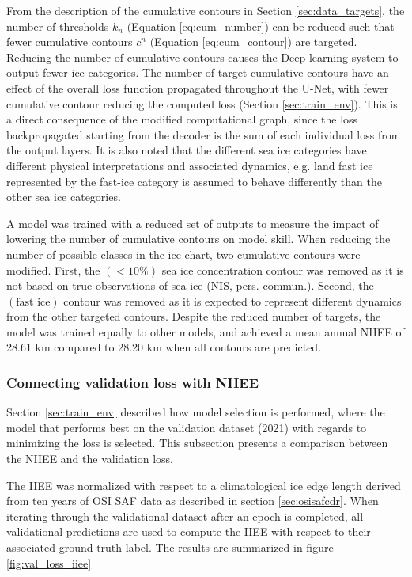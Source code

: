 \documentclass[../main/thesis]{subfiles}
\begin{document}
From the description of the cumulative contours in Section \ref{sec:data_targets}, the number of thresholds $k_n$ (Equation \ref{eq:cum_number}) can be reduced such that fewer cumulative contours $c^n$ (Equation \ref{eq:cum_contour}) are targeted. Reducing the number of cumulative contours causes the Deep learning system to output fewer ice categories. The number of target cumulative contours have an effect of the overall loss function propagated throughout the U-Net, with fewer cumulative contour reducing the computed loss (Section \ref{sec:train_env}). This is a direct consequence of the modified computational graph, since the loss backpropagated starting from the decoder is the sum of each individual loss from the output layers. It is also noted that the different sea ice categories have different physical interpretations and associated dynamics, e.g. land fast ice represented by the fast-ice category is assumed to behave differently than the other sea ice categories.

A model was trained with a reduced set of outputs to measure the impact of lowering the number of cumulative contours on model skill. When reducing the number of possible classes in the ice chart, two cumulative contours were modified. First, the $(< 10\%)$ sea ice concentration contour was removed as it is not based on true observations of sea ice (NIS, pers. commun.). Second, the $(\text{fast ice})$ contour was removed as it is expected to represent different dynamics from the other targeted contours. Despite the reduced number of targets, the model was trained equally to other models, and achieved a mean annual NIIEE of 28.61 km compared to 28.20 km when all contours are predicted.

\subsubsection{Connecting validation loss with NIIEE}
\label{sec:connecting_val_loss_with_NIIEE}
Section \ref{sec:train_env} described how model selection is performed, where the model that performs best on the validation dataset (2021) with regards to minimizing the loss is selected. This subsection presents a comparison between the NIIEE and the validation loss.

The IIEE was normalized with respect to a climatological ice edge length derived from ten years of OSI SAF data as described in section \ref{sec:osisafcdr}. When iterating through the validational dataset after an epoch is completed, all validational predictions are used to compute the IIEE with respect to their associated ground truth label. The results are summarized in figure \ref{fig:val_loss_iiee}
\end{document}
